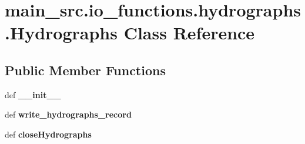 \hypertarget{classmain__src_1_1io__functions_1_1hydrographs_1_1Hydrographs}{\section{main\-\_\-src.\-io\-\_\-functions.\-hydrographs.\-Hydrographs Class Reference}
\label{classmain__src_1_1io__functions_1_1hydrographs_1_1Hydrographs}
}
\subsection*{Public Member Functions}
\begin{DoxyCompactItemize}
\item 
\hypertarget{classmain__src_1_1io__functions_1_1hydrographs_1_1Hydrographs_a9f10ce970d4ffc098b096fd38be3d6c4}{def {\bfseries \-\_\-\-\_\-init\-\_\-\-\_\-}}\label{classmain__src_1_1io__functions_1_1hydrographs_1_1Hydrographs_a9f10ce970d4ffc098b096fd38be3d6c4}

\item 
\hypertarget{classmain__src_1_1io__functions_1_1hydrographs_1_1Hydrographs_a7ab5c157373728f450f415ef68ad07a7}{def {\bfseries write\-\_\-hydrographs\-\_\-record}}\label{classmain__src_1_1io__functions_1_1hydrographs_1_1Hydrographs_a7ab5c157373728f450f415ef68ad07a7}

\item 
\hypertarget{classmain__src_1_1io__functions_1_1hydrographs_1_1Hydrographs_a4f0db8b469e956af2e231e7ea9a2b832}{def {\bfseries close\-Hydrographs}}\label{classmain__src_1_1io__functions_1_1hydrographs_1_1Hydrographs_a4f0db8b469e956af2e231e7ea9a2b832}

\end{DoxyCompactItemize}
